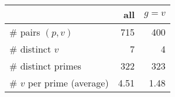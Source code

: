 \begin{table}[ht]
    \centering
    \begin{tabular}{lrr}
        \toprule
                                  & all  &  $g = v$  \\ \midrule
        \# pairs $(p, v)$      & 715  & 400       \\ 
        \# distinct $v$           & 7    & 4         \\
        \# distinct primes        & 322  & 323       \\ 
        \# $v$ per prime (average) & 4.51 & 1.48      \\ \bottomrule
    \end{tabular}
    \label{tab:experiments}
\end{table}